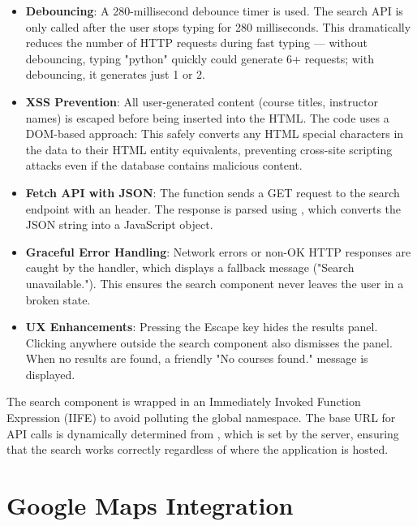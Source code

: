 \documentclass[12pt,a4paper]{report}
\begin{document}
\begin{itemize}
    \item \textbf{Debouncing}: A 280-millisecond debounce timer is used. The search API is only called after the user stops typing for 280 milliseconds. This dramatically reduces the number of HTTP requests during fast typing — without debouncing, typing "python" quickly could generate 6+ requests; with debouncing, it generates just 1 or 2.
    
    \item \textbf{XSS Prevention}: All user-generated content (course titles, instructor names) is escaped before being inserted into the HTML. The code uses a DOM-based approach:  This safely converts any HTML special characters in the data to their HTML entity equivalents, preventing cross-site scripting attacks even if the database contains malicious content.
    
    \item \textbf{Fetch API with JSON}: The  function sends a GET request to the search endpoint with an  header. The response is parsed using , which converts the JSON string into a JavaScript object.
    
    \item \textbf{Graceful Error Handling}: Network errors or non-OK HTTP responses are caught by the  handler, which displays a fallback message ("Search unavailable."). This ensures the search component never leaves the user in a broken state.
    
    \item \textbf{UX Enhancements}: Pressing the Escape key hides the results panel. Clicking anywhere outside the search component also dismisses the panel. When no results are found, a friendly "No courses found." message is displayed.
\end{itemize}

The search component is wrapped in an Immediately Invoked Function Expression (IIFE) to avoid polluting the global namespace. The base URL for API calls is dynamically determined from , which is set by the server, ensuring that the search works correctly regardless of where the application is hosted.

\section{Google Maps Integration}
\end{document}
